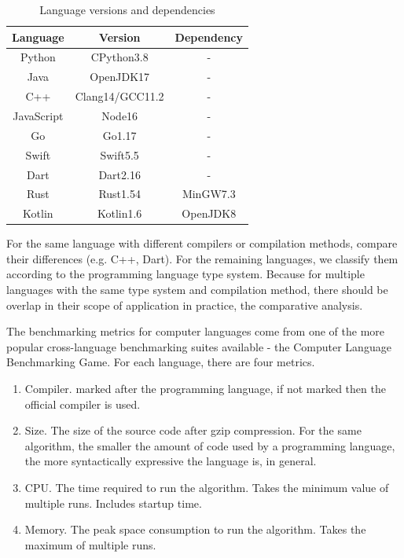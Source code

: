 \begin{table}[htbp]
    \caption{Language versions and dependencies}
    \label{tab:version}
    \begin{center}
        \begin{tabular}{ccc}
            \toprule
            Language   & Version         & Dependency \\
            \midrule
            Python     & CPython3.8      & -          \\
            Java       & OpenJDK17       & -          \\
            C++        & Clang14/GCC11.2 & -          \\
            JavaScript & Node16          & -          \\
            Go         & Go1.17          & -          \\
            Swift      & Swift5.5        & -          \\
            Dart       & Dart2.16        & -          \\
            Rust       & Rust1.54        & MinGW7.3   \\
            Kotlin     & Kotlin1.6       & OpenJDK8   \\
            \bottomrule
        \end{tabular}
    \end{center}
\end{table}

For the same language with different compilers or compilation methods, compare their differences (e.g. C++, Dart). For the remaining languages, we classify them according to the programming language type system. Because for multiple languages with the same type system and compilation method, there should be overlap in their scope of application in practice, the comparative analysis.

The benchmarking metrics for computer languages come from one of the
more popular cross-language benchmarking suites available -
the Computer Language Benchmarking Game\cite{gouy2017computer}.
For each language, there are four metrics.


\begin{enumerate}
    \item Compiler. marked after the programming language, if not marked then the official compiler is used.
    \item Size. The size of the source code after gzip compression. For the same algorithm, the smaller the amount of code used by a programming language, the more syntactically expressive the language is, in general.
    \item CPU. The time required to run the algorithm. Takes the minimum value of multiple runs. Includes startup time.
    \item Memory. The peak space consumption to run the algorithm. Takes the maximum of multiple runs.
\end{enumerate}

